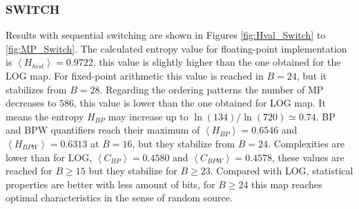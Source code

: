 \subsubsection{SWITCH} \label{sssec:switch}

Results with sequential switching are shown in Figures \ref{fig:Hval_Switch} to \ref{fig:MP_Switch}.
The calculated entropy value for floating-point implementation is $\left\langle H_{hist}\right\rangle =0.9722$, this value is slightly higher than the one obtained for the LOG map. 
For fixed-point arithmetic this value is reached in $B=24$, but it stabilizes from $B=28$.
Regarding the ordering patterns the number of MP decreases to $586$, this value is lower than the one obtained for LOG map.
It means the entropy $H_{BP}$ may increase up to $\ln(134)/\ln(720)\simeq 0.74$.
BP and BPW quantifiers reach their maximum of $\left\langle H_{BP}\right\rangle =0.6546$ and $\left\langle H_{BPW}\right\rangle =0.6313$ at $B=16$, but they stabilize from $B=24$.
Complexities are lower than for LOG, $\left\langle C_{BP}\right\rangle =0.4580$ and $\left\langle C_{BPW}\right\rangle =0.4578$, these values are reached for $B \geq 15$ but they stabilize for $B \geq 23$.
Compared with LOG, statistical properties are better with less amount of bits, for $B \geq 24$ this map reaches optimal characteristics in the sense of random source.

